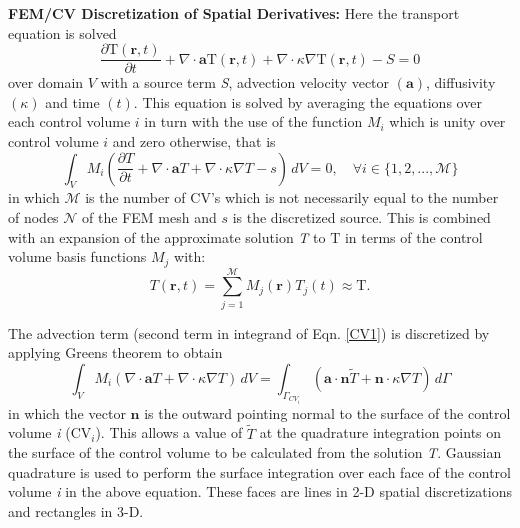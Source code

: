 \noindent
\textbf{FEM/CV Discretization of Spatial Derivatives: } Here the transport equation is solved
\begin{equation}
\displaystyle\frac{\partial \text{T}(\mathbf{r},t) }{\partial t} + \nabla\cdot \textbf{a}
\text{T}(\mathbf{r},t) +\nabla\cdot \kappa \nabla \text{T}(\mathbf{r},t)  - S = 0
\label{traneq}
\end{equation}
over domain $V$ with a source term \textit{S}, advection velocity vector $\left(\mathbf{a}\right)$, diffusivity $\left(\kappa\right)$ and time $\left(\textit{t}\right)$.  This equation is solved by averaging the equations over each control volume $i$ in turn with the use of the function $M_{i}$ which is unity over control volume $i$ and zero otherwise, that is
\begin{equation}
\int_{V} M_{i} \left( \frac{\partial T }{\partial t} +
\nabla\cdot \textbf{a} T +\nabla\cdot \kappa \nabla T - s \right)\,d V
= 0, \quad \forall i \in \{1,2,..., \mathcal{M}\}
\label{CV1}
\end {equation}
\noindent
in which $\mathcal{M}$ is the number of CV's which is not necessarily equal to the number of nodes $\mathcal{N}$ of the FEM mesh and $s$ is the discretized source. This is combined with an expansion of the approximate solution \textit{T} to $\text{T}$ in terms of the control volume basis functions $M_{j}$ with:
\begin{equation}  
T\left(\mathbf{r},t\right)=\sum\limits_{j=1}^{\mathcal{M}} M_{j}\left(\mathbf{r}\right) T_{j}(t) \approx \text{T}.
\end{equation}

The advection term (second term in integrand of Eqn. \ref{CV1}) is discretized by applying Greens theorem to obtain
\begin{equation}
\int_{V} M_{i} \left( \nabla \cdot \mathbf{a} T+\nabla\cdot \kappa \nabla T \right)\,d V = \int_{\Gamma_{CV_i}} \left(\mathbf{a}\cdot \mathbf{n}\widetilde{T}+\mathbf{n}\cdot \kappa \nabla T \right) \,d \Gamma
\label{a}
\end{equation}
\noindent
in which the vector $\mathbf{n}$ is the outward pointing normal to the surface of the control volume \textit{i} (CV$_{i}$).  This allows a value of $\widetilde{T}$ at the quadrature integration points on the surface of the control volume to be calculated from the solution \textit{T}. Gaussian quadrature is used to perform the surface integration over each face of the control volume \textit{i} in the above equation.  These faces are lines in 2-D spatial discretizations and rectangles in 3-D.

